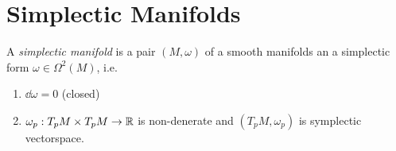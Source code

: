 \section{Simplectic Manifolds} \label{sec:simplectic_manifolds}
\begin{definition}
	A \emph{simplectic manifold} is a pair  $(M, \omega)$ of a smooth manifolds an a simplectic form $\omega \in \Omega^2(M)$, i.e. 
	\begin{enumerate}
		\item $\dd \omega = 0$ (closed)
		\item $\omega_p : T_pM \times T_pM \to \mathbb{R}$ is non-denerate and $(T_pM, \omega_p)$ is symplectic vectorspace.
	\end{enumerate}
\end{definition}
